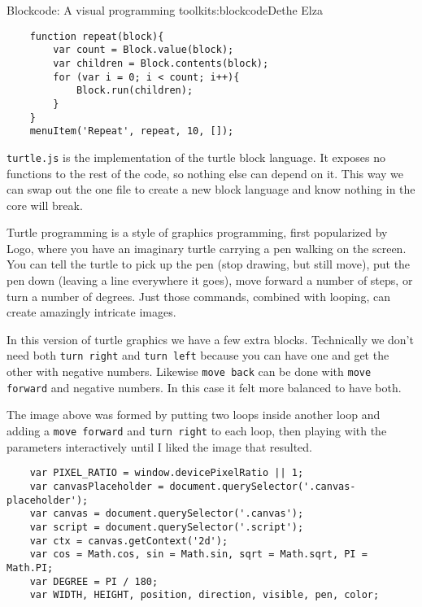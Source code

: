 \begin{aosachapter}{Blockcode: A visual programming toolkit}{s:blockcode}{Dethe Elza}
\begin{verbatim}
    function repeat(block){
        var count = Block.value(block);
        var children = Block.contents(block);
        for (var i = 0; i < count; i++){
            Block.run(children);
        }
    }
    menuItem('Repeat', repeat, 10, []);
\end{verbatim}

\label{turtle.js}

\texttt{turtle.js} is the implementation of the turtle block language.
It exposes no functions to the rest of the code, so nothing else can
depend on it. This way we can swap out the one file to create a new
block language and know nothing in the core will break.


Turtle programming is a style of graphics programming, first popularized
by Logo, where you have an imaginary turtle carrying a pen walking on
the screen. You can tell the turtle to pick up the pen (stop drawing,
but still move), put the pen down (leaving a line everywhere it goes),
move forward a number of steps, or turn a number of degrees. Just those
commands, combined with looping, can create amazingly intricate images.

In this version of turtle graphics we have a few extra blocks.
Technically we don't need both \texttt{turn right} and
\texttt{turn left} because you can have one and get the other with
negative numbers. Likewise \texttt{move back} can be done with
\texttt{move forward} and negative numbers. In this case it felt more
balanced to have both.

The image above was formed by putting two loops inside another loop and
adding a \texttt{move forward} and \texttt{turn right} to each loop,
then playing with the parameters interactively until I liked the image
that resulted.

\begin{verbatim}
    var PIXEL_RATIO = window.devicePixelRatio || 1;
    var canvasPlaceholder = document.querySelector('.canvas-placeholder');
    var canvas = document.querySelector('.canvas');
    var script = document.querySelector('.script');
    var ctx = canvas.getContext('2d');
    var cos = Math.cos, sin = Math.sin, sqrt = Math.sqrt, PI = Math.PI;
    var DEGREE = PI / 180;
    var WIDTH, HEIGHT, position, direction, visible, pen, color;
\end{verbatim}


\end{aosachapter}
